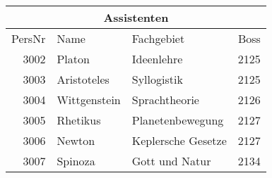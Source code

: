 {
\begin{tabular}[t]{|r|l|l|r|}
  \hline
  \multicolumn{4}{|c|}{Assistenten}\\
  \hline
  PersNr & Name & Fachgebiet & Boss\\
  \hline\hline
  3002 & Platon & Ideenlehre & 2125\\
  3003 & Aristoteles & Syllogistik & 2125\\
  3004 & Wittgenstein & Sprachtheorie & 2126\\
  3005 & Rhetikus & Planetenbewegung & 2127\\
  3006 & Newton & Keplersche Gesetze & 2127\\
  3007 & Spinoza & Gott und Natur & 2134\\
  \hline
\end{tabular}}

